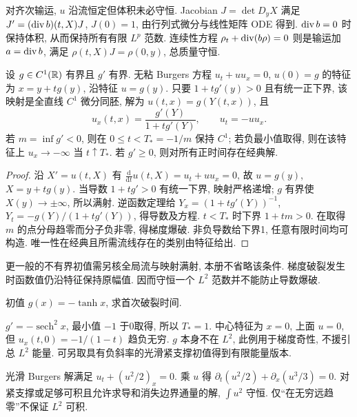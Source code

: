 对齐次输运, $u$ 沿流恒定但体积未必守恒. Jacobian $J=\det D_yX$ 满足 $J'=(\operatorname{div} b)(t,X)J$, $J(0)=1$, 由行列式微分与线性矩阵 ODE 得到. $\operatorname{div} b=0$ 时保持体积, 从而保持所有有限 $L^p$ 范数. 连续性方程 $\rho_t+\operatorname{div}(b\rho)=0$ 则是输运加 $a=\operatorname{div} b$, 满足 $\rho(t,X)J=\rho(0,y)$, 总质量守恒.
\begin{theorem}\label{thm:burgers}
设 $g\in C^1(\mathbb R)$ 有界且 $g'$ 有界. 无粘 Burgers 方程 $u_t+uu_x=0$, $u(0)=g$ 的特征为 $x=y+tg(y)$, 沿特征 $u=g(y)$. 只要 $1+tg'(y)>0$ 且有统一正下界, 该映射是全直线 $C^1$ 微分同胚, 解为 $u(t,x)=g(Y(t,x))$, 且
\[
u_x(t,x)=\frac{g'(Y)}{1+tg'(Y)},\qquad u_t=-u u_x.
\]
若 $m=\inf g'<0$, 则在 $0\le t<T_*=-1/m$ 保持 $C^1$; 若负最小值取得, 则在该特征上 $u_x\to-\infty$ 当 $t\uparrow T_*$. 若 $g'\ge0$, 则对所有正时间存在经典解.
\end{theorem}
\begin{proof}
沿 $X'=u(t,X)$ 有 $\frac{\mathrm d}{\mathrm dt}u(t,X)=u_t+uu_x=0$, 故 $u=g(y)$, $X=y+tg(y)$. 当导数 $1+tg'>0$ 有统一下界, 映射严格递增; $g$ 有界使 $X(y)\to\pm\infty$, 所以满射. 逆函数定理给 $Y_x=(1+tg'(Y))^{-1}$, $Y_t=-g(Y)/(1+tg'(Y))$, 得导数及方程. $t<T_*$ 时下界 $1+tm>0$. 在取得 $m$ 的点分母趋零而分子负非零, 得梯度爆破. 非负导数给下界1, 任意有限时间均可构造. 唯一性在经典且所需流线存在的类别由特征给出.
\end{proof}
更一般的不有界初值需另核全局流与映射满射, 本册不省略该条件. 梯度破裂发生时函数值仍沿特征保持原幅值. 因而守恒一个 $L^2$ 范数并不能防止导数爆破.
\begin{example}
初值 $g(x)=-\tanh x$, 求首次破裂时间.
\end{example}
\begin{solution}
$g'=-\operatorname{sech}^2x$, 最小值 $-1$ 于0取得, 所以 $T_*=1$. 中心特征为 $x=0$, 上面 $u=0$, 但 $u_x(t,0)=-1/(1-t)$ 趋负无穷. $g$ 本身不在 $L^2$, 此例用于梯度奇性, 不援引总 $L^2$ 能量. 可另取具有负斜率的光滑紧支撑初值得到有限能量版本.
\end{solution}
光滑 Burgers 解满足 $u_t+(u^2/2)_x=0$. 乘 $u$ 得 $\partial_t(u^2/2)+\partial_x(u^3/3)=0$. 对紧支撑或足够可积且允许求导和消失边界通量的解, $\int u^2$ 守恒. 仅“在无穷远趋零”不保证 $L^2$ 可积.

